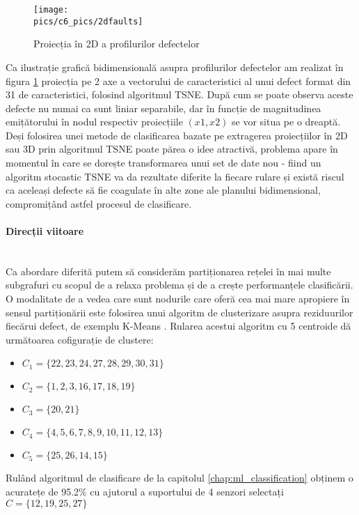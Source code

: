 \begin{figure}[H]
\centering
\texttt{[image: \\pics/c6\_pics/2dfaults]}
\caption{Proiecția în 2D a profilurilor defectelor}
\label{fig:tsne_faults}
\end{figure}

Ca ilustrație grafică bidimensională asupra profilurilor defectelor am realizat în figura \ref{fig:tsne_faults} proiecția pe 2 axe a vectorului de caracteristici al unui defect format din 31 de caracteristici, folosind algoritmul TSNE. După cum se poate observa aceste defecte nu numai ca sunt liniar separabile, dar în funcție de magnitudinea emițătorului în nodul respectiv proiecțiile $(x1, x2)$ se vor situa pe o dreaptă. Deși folosirea unei metode de clasificarea bazate pe extragerea proiecțiilor în 2D sau 3D prin algoritmul TSNE poate părea o idee atractivă, problema apare în momentul în care se dorește transformarea unui set de date nou - fiind un algoritm stocastic TSNE va da rezultate diferite la fiecare rulare și există riscul ca aceleași defecte să fie coagulate în alte zone ale planului bidimensional, compromițând astfel procesul de clasificare.


\paragraph{Direcții viitoare} \mbox{} \\

Ca abordare diferită putem să considerăm partiționarea rețelei în mai multe subgrafuri \cite{irofti2017dictionary}  cu scopul de a relaxa problema și de a crește performanțele clasificării. O modalitate de a vedea care sunt nodurile care oferă cea mai mare apropiere în sensul partiționării este folosirea unui algoritm de clusterizare asupra reziduurilor fiecărui defect, de exemplu K-Means \cite{k-means}. Rularea acestui algoritm cu 5 centroide dă următoarea cofigurație de clustere:

\begin{itemize}
    \item $C_1 = \{22, 23, 24, 27, 28, 29, 30, 31\}$
    \item $C_2 = \{1, 2, 3, 16, 17, 18, 19\}$
    \item $C_3 = \{  20, 21\}$
    \item $C_4 = \{ 4, 5, 6, 7, 8, 9, 10, 11, 12, 13\}$
    \item $C_5 = \{ 25, 26, 14, 15\}$
\end{itemize}

Rulând algoritmul de clasificare de la capitolul \ref{chap:ml_classification} obținem o acuratețe de 95.2\% cu ajutorul a suportului de 4 senzori selectați $C=\{12, 19, 25, 27\}$


